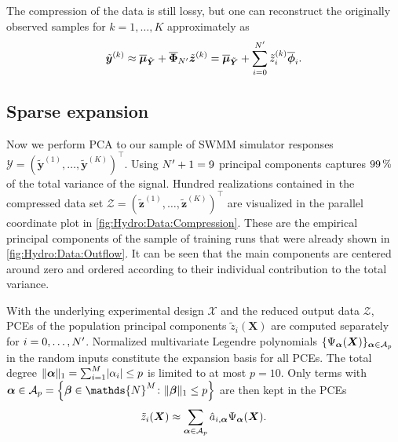 The compression of the data is still lossy, but one can reconstruct the originally observed samples for \(k=1,\ldots,K\) approximately as
\begin{equation} \label{eq:Hydro:ApproximateReconstruction}
  \tilde{\bm{y}}^{(k)} \approx \overline{\bm{\mu}}_{\tilde{\bm{Y}}} + \overline{\bm{\Phi}}_{N^\prime} \tilde{\bm{z}}^{(k)}
  = \overline{\bm{\mu}}_{\tilde{\bm{Y}}} + \sum\limits_{i=0}^{N^\prime} \tilde{z}_i^{(k)} \overline{\bm{\phi}}_i.
\end{equation}

\subsection{Sparse expansion}
Now we perform PCA to our sample of SWMM simulator responses \(\mathcal{Y} = (\tilde{\bm{y}}^{(1)},\ldots,\tilde{\bm{y}}^{(K)})^\top\).
Using \(N^\prime + 1 = 9\) principal components captures \(\unit[99]{\%}\) of the total variance of the signal.
Hundred realizations contained in the compressed data set \(\mathcal{Z} = (\tilde{\bm{z}}^{(1)},\ldots,\tilde{\bm{z}}^{(K)})^\top\)
are visualized in the parallel coordinate plot in \cref{fig:Hydro:Data:Compression}.
These are the empirical principal components of the sample of training runs that were already shown in \cref{fig:Hydro:Data:Outflow}.
It can be seen that the main components are centered around zero and ordered according to their individual contribution to the total variance.
\par %
With the underlying experimental design \(\mathcal{X}\) and the reduced output data \(\mathcal{Z}\),
PCEs of the population principal components \(\tilde{z}_i(\bm{X})\) are computed separately for \(i=0,\ldots,N^\prime\).
Normalized multivariate Legendre polynomials \(\{\Psi_{\bm{\alpha}}(\bm{X})\}_{\bm{\alpha} \in \mathcal{A}_p}\) in the random inputs constitute the expansion basis for all PCEs.
The total degree \(\lVert \bm{\alpha} \rVert_1 = \sum_{i=1}^M \lvert \alpha_i \rvert \leq p\) is limited to at most \(p=10\).
Only terms with \(\bm{\alpha} \in \mathcal{A}_p = \left\{ \bm{\beta} \in \mathds{N}^\dimParam \colon \lVert \bm{\beta} \rVert_1 \leq p \right\}\) are then kept in the PCEs
\begin{equation} \label{eq:Hydro:PrincipalComponentPCE}
  \tilde{z}_i(\bm{X}) \approx \sum\limits_{\bm{\alpha} \in \mathcal{A}_p} \hat{a}_{i,\bm{\alpha}} \Psi_{\bm{\alpha}}(\bm{X}).
\end{equation}
\par %
